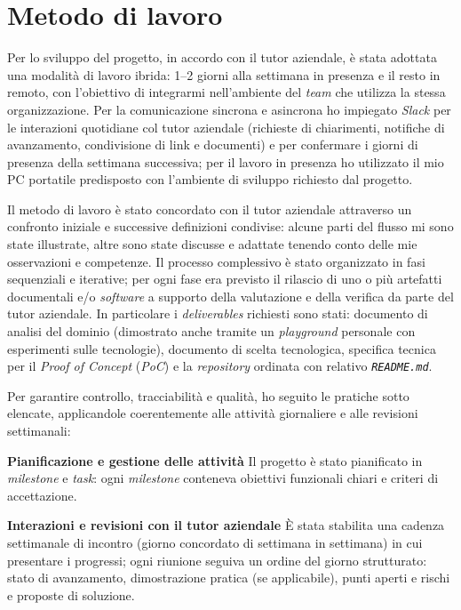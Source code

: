 \section{Metodo di lavoro}

Per lo sviluppo del progetto, in accordo con il tutor aziendale, è stata adottata una modalità di lavoro ibrida: 1–2 giorni alla settimana in presenza e il resto in remoto, 
con l'obiettivo di integrarmi nell'ambiente del \emph{team} che utilizza la stessa organizzazione. Per la comunicazione sincrona e asincrona ho impiegato 
\emph{Slack} per le interazioni quotidiane col tutor aziendale (richieste di chiarimenti, notifiche di avanzamento, condivisione di link e documenti) e per confermare i giorni di presenza 
della settimana successiva; per il lavoro in presenza ho utilizzato il mio PC portatile predisposto con l'ambiente di sviluppo richiesto dal progetto.

Il metodo di lavoro è stato concordato con il tutor aziendale attraverso un confronto iniziale e successive definizioni condivise: alcune parti del 
flusso mi sono state illustrate, altre sono state discusse e adattate tenendo conto delle mie osservazioni e competenze. Il processo complessivo è stato organizzato 
in fasi sequenziali e iterative; per ogni fase era previsto il rilascio di uno o più artefatti documentali e/o \emph{software} a supporto della valutazione e della 
verifica da parte del tutor aziendale. In particolare i \emph{deliverables} richiesti sono stati: documento di analisi del dominio (dimostrato anche tramite un \emph{playground} 
personale con esperimenti sulle tecnologie), documento di scelta tecnologica, specifica tecnica per il \emph{Proof of Concept} (\emph{PoC}) e la \emph{repository} ordinata con relativo \texttt{\emph{README.md}}.

Per garantire controllo, tracciabilità e qualità, ho seguito le pratiche sotto elencate, applicandole coerentemente alle attività giornaliere e alle revisioni settimanali:

\medskip
\noindent\textbf{Pianificazione e gestione delle attività}
Il progetto è stato pianificato in \emph{milestone} e \emph{task}: ogni \emph{milestone} conteneva obiettivi funzionali chiari e criteri di accettazione. 

\medskip
\noindent\textbf{Interazioni e revisioni con il tutor aziendale}
È stata stabilita una cadenza settimanale di incontro (giorno concordato di settimana in settimana) in cui presentare i progressi; 
ogni riunione seguiva un ordine del giorno strutturato: stato di avanzamento, dimostrazione pratica (se applicabile), punti aperti e rischi e proposte di soluzione.


